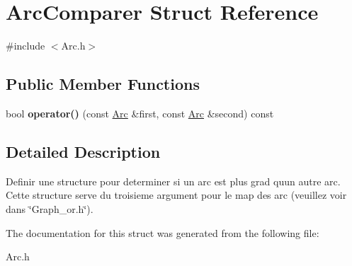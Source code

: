 \hypertarget{structArcComparer}{}\section{Arc\+Comparer Struct Reference}
\label{structArcComparer}


{\ttfamily \#include $<$Arc.\+h$>$}

\subsection*{Public Member Functions}
\begin{DoxyCompactItemize}
\item 
bool {\bfseries operator()} (const \hyperlink{structArc}{Arc} \&first, const \hyperlink{structArc}{Arc} \&second) const \hypertarget{structArcComparer_a6beed8d4b528f7182cea15f5e8a3ce51}{}\label{structArcComparer_a6beed8d4b528f7182cea15f5e8a3ce51}

\end{DoxyCompactItemize}


\subsection{Detailed Description}
Definir une structure pour determiner si un arc est plus grad qu\textquotesingle{}un autre arc. Cette structure serve du troisieme argument pour le map des arc (veuillez voir dans \char`\"{}\+Graph\+\_\+or.\+h\char`\"{}). 

The documentation for this struct was generated from the following file\+:\begin{DoxyCompactItemize}
\item 
Arc.\+h\end{DoxyCompactItemize}
